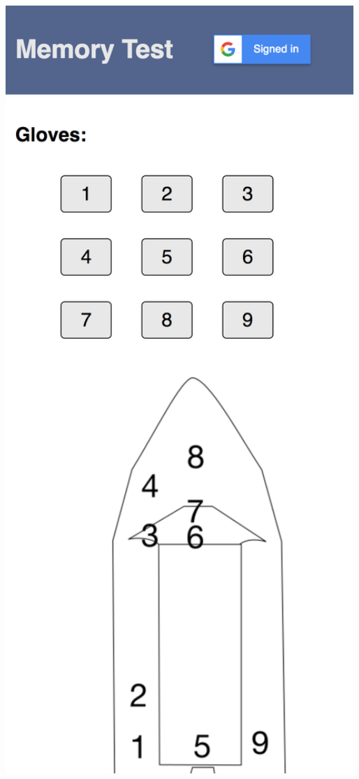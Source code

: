 \documentclass[ %
                    author={Elis Jones},
                supervisor={Dr. Kirsten Cater},
                    degree={BSc},
                     title={The Effect of Presentation Medium on Spatial Cognition},
                  subtitle={in the Virtual Environment},
                      year={2018} ]{dissertation}
\begin{document}
\begin{center}
\begin{minipage}{0.3\textwidth}
    \end{minipage}\hfill
    \begin{minipage}{0.3\textwidth}
        \centering
        \includegraphics[width=1\textwidth]{images/web-question.png}

\end{minipage}
\end{center}
\end{document}
